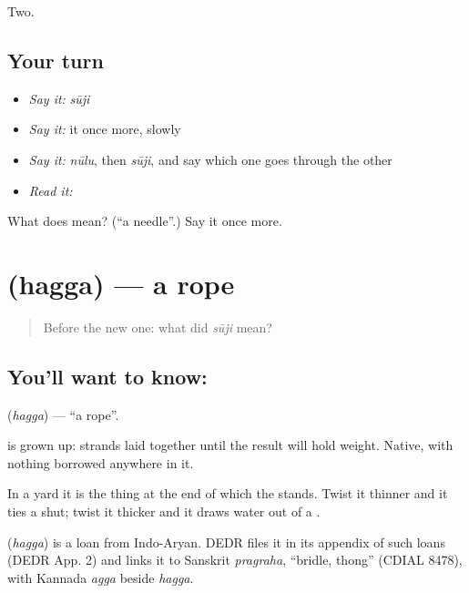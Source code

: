 \begin{grammarlens}[title={What you've built}]
Two.
\end{grammarlens}

\subsection*{Your turn}
\begin{itemize}
\raggedright
  \item \emph{Say it:} \emph{sūji}
  \item \emph{Say it:} it once more, slowly
  \item \emph{Say it:} \emph{nūlu}, then \emph{sūji}, and say which one goes through the other
  \item \emph{Read it:} \textbf{}
\end{itemize}

\begin{tcolorbox}[breakable,colback=teal!4,colframe=teal!35!black,title={Before you move on}]
What does  mean? (\textquotedblleft{}a needle\textquotedblright{}.) Say it once more.
\end{tcolorbox}
\section[\texorpdfstring{\kn{ಹಗ್ಗ} (hagga)}{ಹಗ್ಗ (hagga)}]{ (hagga) — a rope}

\label{lesson:KA-C62-rope}



\begin{quote}
Before the new one: what did \emph{sūji} mean?
\end{quote}

\subsection*{You'll want to know: }
\textbf{} (\emph{hagga}) — \textquotedblleft{}a rope\textquotedblright{}.

 is  grown up: strands laid together until the result will hold weight. Native, with nothing borrowed anywhere in it.

In a  yard it is the thing at the end of which the  stands. Twist it thinner and it ties a  shut; twist it thicker and it draws water out of a .

\begin{cousinweb}
\textbf{} (\emph{hagga}) is a loan from Indo-Aryan. DEDR files it in its appendix of such loans (DEDR App. 2) and links it to Sanskrit \emph{pragraha}, \textquotedblleft{}bridle, thong\textquotedblright{} (CDIAL 8478), with Kannada \emph{agga} beside \emph{hagga}.
\end{cousinweb}

